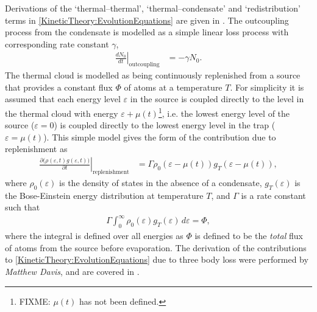Derivations of the `thermal--thermal', `thermal--condensate' and `redistribution' terms in \eqref{KineticTheory:EvolutionEquations} are given in \citep{Bijlsma:2000}. The outcoupling process from the condensate is modelled as a simple linear loss process with corresponding rate constant $\gamma$,
\begin{align}
    \left.\frac{d N_0}{d t}\right|_\text{outcoupling} &= - \gamma N_0.
    \label{KineticTheory:OutcouplingProcess}
\end{align}
The thermal cloud is modelled as being continuously replenished from a source that provides a constant flux $\Phi$ of atoms at a temperature $T$. For simplicity it is assumed that each energy level $\varepsilon$ in the source is coupled directly to the level in the thermal cloud with energy $\varepsilon + \mu(t)$\footnote{FIXME: $\mu(t)$ has not been defined.}, i.e. the lowest energy level of the source ($\varepsilon=0$) is coupled directly to the lowest energy level in the trap ($\varepsilon = \mu(t)$). This simple model gives the form of the contribution due to replenishment as
\begin{align}
    \left. \frac{\partial \big(\rho(\varepsilon, t) g(\varepsilon, t))}{\partial t} \right|_\text{replenishment} &= \Gamma \rho_0(\varepsilon - \mu(t)) g_T(\varepsilon - \mu(t)),
    \label{KineticTheory:ReplenishmentProcess}
\end{align}
where $\rho_0(\varepsilon)$ is the density of states in the absence of a condensate, $g_T(\varepsilon)$ is the Bose-Einstein energy distribution at temperature $T$, and $\Gamma$ is a rate constant such that
\begin{align}
    \Gamma \int_0^\infty \rho_0(\varepsilon) g_T(\varepsilon)\, d\varepsilon = \Phi,
    \label{KineticTheory:GammaPhiRelation}
\end{align}
where the integral is defined over all energies as $\Phi$ is defined to be the \emph{total} flux of atoms from the source before evaporation. The derivation of the contributions to \eqref{KineticTheory:EvolutionEquations} due to three body loss were performed by \emph{Matthew Davis}, and are covered in .

